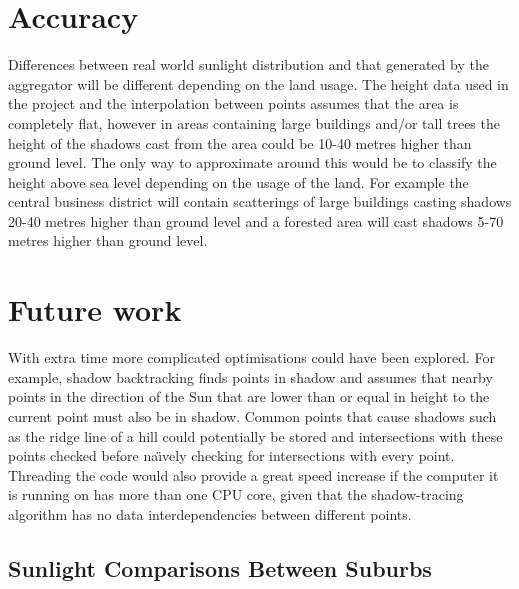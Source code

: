 \documentclass[12pt]{report}
\newcommand{\note}[1]{}
\newcommand{\notedme}[1]{}
\begin{document}
\section{Accuracy}
Differences between real world sunlight distribution and that generated by the aggregator will be different depending on the land usage. The height data used in the project and the interpolation between points assumes that the area is completely flat, however in areas containing large buildings and/or tall trees the height of the shadows cast from the area could be 10-40 metres higher than ground level. The only way to approximate around this would be to classify the height above sea level depending on the usage of the land. For example the central business district will contain scatterings of large buildings casting shadows 20-40 metres higher than ground level and a forested area will cast shadows 5-70 metres higher than ground level.

\section{Future work}
With extra time more complicated optimisations could have been explored. For example, shadow backtracking
finds points in shadow and assumes that nearby points in the direction of the Sun that are lower than or equal in height to the current point must also be in shadow. Common points that cause shadows such as the ridge line of a hill could potentially be stored and intersections with these points checked before na\"{\i}vely checking for intersections with every point. Threading the code would also provide a great speed increase if the computer it is running on has more than one CPU core, given that the shadow-tracing algorithm has no data interdependencies between different points.\notedme{you need to justify this by saying that you know the data is separable. Some software has data dependencies that means multi-core systems won't speed it up.}\note{this is stated earlier in the section but I'll add it again here}
\note{Part on the suburb masking code}

\subsection{Sunlight Comparisons Between Suburbs}
\end{document}

